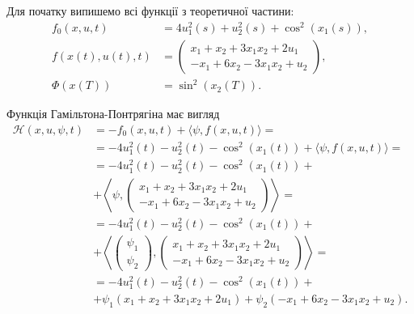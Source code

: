 \begin{solution}
    Для початку випишемо всі функції з теоретичної частини:
    \begin{equation}
        \begin{aligned}
            f_0(x, u, t) &=  4 u_1^2(s) + u_2^2(s) + \cos^2(x_1(s)), \\
            f(x(t), u(t), t) &= \begin{pmatrix} x_1 + x_2 + 3 x_1 x_2 + 2 u_1 \\ - x_1 + 6 x_2 - 3 x_1 x_2 + u_2 \end{pmatrix}, \\
            \Phi(x(T)) &= \sin^2(x_2(T)).
        \end{aligned}
    \end{equation}

    Функція Гамільтона-Понтрягіна має вигляд
    \begin{equation}
        \begin{aligned}
        \mathcal{H} (x, u, \psi, t) &= - f_0(x, u, t) + \langle \psi, f(x, u, t) \rangle = \\
        &= - 4 u_1^2(t) - u_2^2(t) - \cos^2(x_1(t)) + \langle \psi, f(x, u, t) \rangle = \\
        &= - 4 u_1^2(t) - u_2^2(t) - \cos^2(x_1(t)) + \\
        &+ \left \langle \psi, \begin{pmatrix} x_1 + x_2 + 3 x_1 x_2 + 2 u_1 \\ - x_1 + 6 x_2 - 3 x_1 x_2 + u_2 \end{pmatrix} \right \rangle = \\
        &= - 4 u_1^2(t) - u_2^2(t) - \cos^2(x_1(t)) + \\
        &+ \left \langle \begin{pmatrix} \psi_1 \\ \psi_2 \end{pmatrix}, \begin{pmatrix} x_1 + x_2 + 3 x_1 x_2 + 2 u_1 \\ - x_1 + 6 x_2 - 3 x_1 x_2 + u_2 \end{pmatrix} \right \rangle = \\
        &= - 4 u_1^2(t) - u_2^2(t) - \cos^2(x_1(t)) + \\
        &+ \psi_1 ( x_1 + x_2 + 3 x_1 x_2 + 2 u_1 ) + \psi_2 ( - x_1 + 6 x_2 - 3 x_1 x_2 + u_2 ).
        \end{aligned}
    \end{equation}
    

\end{solution}
